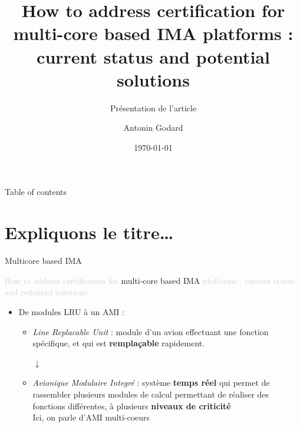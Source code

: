 \documentclass{beamer}
\begin{document}
\title[Présentation d'article INF6600]{How to address certification for multi-core based IMA platforms :
       current status and potential solutions} 
\subtitle{\vspace{1em} Présentation de l'article}
\author{ \vspace{2em} Antonin Godard} 
\date{\today} 

\begin{frame}[plain]
  \titlepage
\end{frame}


\begin{frame}{Table of contents}
  \tableofcontents
\end{frame}


\section{Expliquons le titre…} 
\begin{frame}[t]{Multicore based IMA} 
  
  \begin{center}
    \begin{mdframed}[style=yellowbox]
      {\small\textcolor{lightgray}{How to address certification for} multi-core based IMA \textcolor{lightgray}{platforms :
       current status and potential solutions}}
       \end{mdframed}
  \end{center}
  
  \begin{itemize}
      \item De modules LRU à un AMI :
      \begin{itemize}
          \item \textit{Line Replacable Unit} : module d'un avion effectuant une fonction spécifique, et qui est \textbf{remplaçable} rapidement. \\
          \begin{center}
              $\downarrow$
          \end{center}
          \item \textit{Avionique Modulaire Integré} : système \textbf{temps réel} qui permet de rassembler plusieurs 
          modules de calcul permettant de réaliser des fonctions différentes, à plusieurs \textbf{niveaux de criticité} \\
          Ici, on parle d'AMI multi-coeurs
      \end{itemize}
  \end{itemize}
\end{frame}
\end{document}

